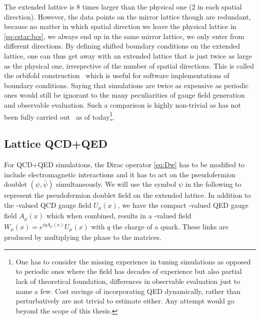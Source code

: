 The extended lattice is \num{8} times larger than the physical one (\num{2} in each spatial direction).
However, the data points on the mirror lattice though are redundant, because no matter in which spatial direction we leave the physical lattice in \cref{eq:cstar:bcs}, we always end up in the same mirror lattice, we only enter from different directions.
By defining shifted boundary conditions on the extended lattice, one can thus get away with an extended lattice that is just twice as large as the physical one, irrespective of the number of spatial \Cstar directions.
This is called the orbifold construction~\cite{openqxd} which is useful for software implementations of \Cstar boundary conditions.
Saying that \Cstar simulations are twice as expensive as periodic ones would still be ignorant to the many peculiarities of gauge field generation and observable evaluation.
Such a comparison is highly non-trivial as has not been fully carried out~\cite{RCstar22} as of today\footnote{One has to consider the missing experience in tuning \Cstar simulations as opposed to periodic ones where the field has decades of experience but also partial lack of theoretical foundation, differences in observable evaluation just to name a few. Cost savings of incorporating QED dynamically, rather than perturbatively are not trivial to estimate either. Any attempt would go beyond the scope of this thesis.}.

\subsection{Lattice QCD+QED}

For QCD+QED simulations, the Dirac operator \cref{eq:Dw} has to be modified to include electromagnetic interactions and it has to act on the pseudofermion doublet $(\psi, \bar{\psi})$ simultaneously.
We will use the symbol $\psi$ in the following to represent the pseudofermion doublet field on the extended lattice.
In addition to the -valued QCD gauge field $U_\mu(x)$, we have the compact -valued QED gauge field $A_\mu(x)$ which when combined, results in a -valued field $W_{\mu}(x) = e^{i q A_\mu(x)} U_\mu(x)$ with $q$ the charge of a quark.
These links are produced by multiplying the  phase to the  matrices.

